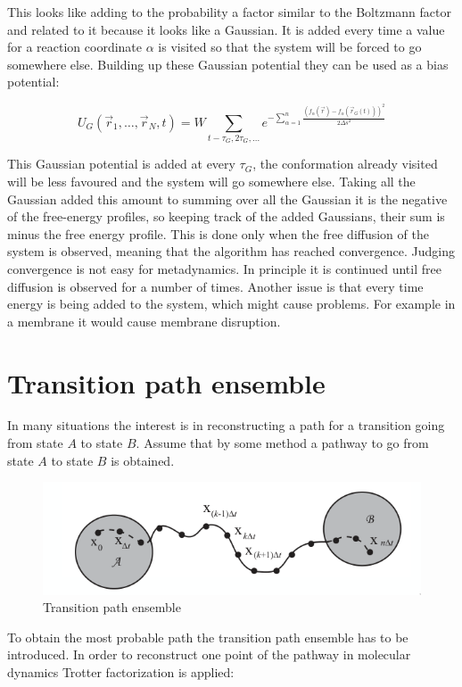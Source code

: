This looks like adding to the probability a factor similar to the Boltzmann factor and related to it because it looks like a Gaussian.
It is added every time a value for a reaction coordinate $\alpha$ is visited so that the system will be forced to go somewhere else.
Building up these Gaussian potential they can be used as a bias potential:

$$U_G(\vec{r}_1, \dots, \vec{r}_N, t) = W\sum\limits_{t - \tau_G, 2\tau_G, \dots}e^{-\sum\limits_{\alpha=1}^n\frac{(f_\alpha(\vec{r})-f_\alpha(\vec{r}_G(t)))^2}{2\Delta s^2}}$$

This Gaussian potential is added at every $\tau_G$, the conformation already visited will be less favoured and the system will go somewhere else.
Taking all the Gaussian added this amount to summing over all the Gaussian it is the negative of the free-energy profiles, so keeping track of the added Gaussians, their sum is minus the free energy profile.
This is done only when the free diffusion of the system is observed, meaning that the algorithm has reached convergence.
Judging convergence is not easy for metadynamics.
In principle it is continued until free diffusion is observed for a number of times.
Another issue is that every time energy is being added to the system, which might cause problems.
For example in a membrane it would cause membrane disruption.

\section{Transition path ensemble}
In many situations the interest is in reconstructing a path for a transition going from state $A$ to state $B$.
Assume that by some method a pathway to go from state $A$ to state $B$ is obtained.

\begin{figure}[H]
	\includegraphics[width=\textwidth]{transition-path-ensemble}
	\caption{Transition path ensemble}
	\label{fig:transition-path-ensemble}
\end{figure}

To obtain the most probable path the transition path ensemble has to be introduced.
In order to reconstruct one point of the pathway in molecular dynamics Trotter factorization is applied:

